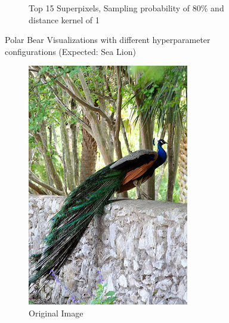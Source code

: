 \begin{figure}
\begin{subfigure}[t]{0.32\textwidth}
        \caption{Top 15 Superpixels, Sampling probability of 80\% and distance kernel of 1}
    \end{subfigure}
    \caption{Polar Bear Visualizations with different hyperparameter configurations (Expected: Sea Lion)}
\end{figure}

\begin{figure}
    \captionsetup{justification=centering}

    \begin{subfigure}[t]{0.48\textwidth}
        \captionsetup{justification=centering}
        \centering
        \includegraphics[width=.7\linewidth]{figuras/lime/experiments/peacock.jpeg}
        \caption{Original Image}
    \end{subfigure}
    \hfill
    \begin{subfigure}[t]{0.48\textwidth}
        \captionsetup{justification=centering}
        \centering

\end{subfigure}
\end{figure}
